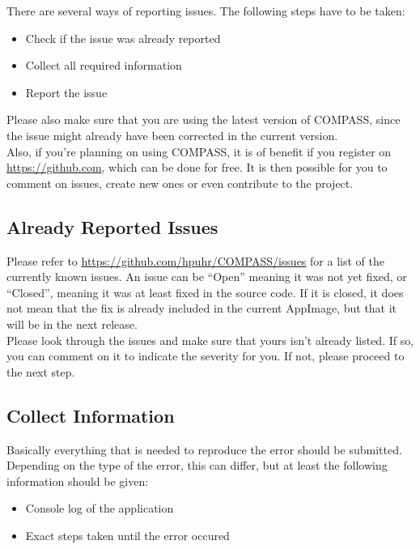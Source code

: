 There are several ways of reporting issues. The following steps have to be taken:

\begin{itemize}  
\item Check if the issue was already reported
\item Collect all required information
\item Report the issue
\end{itemize} 

Please also make sure that you are using the latest version of COMPASS, since the issue might already have been corrected in the current version. \\

Also, if you're planning on using COMPASS, it is of benefit if you register on \url{https://github.com}, which can be done for free. It is then possible for you to comment on issues, create new ones or even contribute to the project.

\subsection{Already Reported Issues}

Please refer to \url{https://github.com/hpuhr/COMPASS/issues} for a list of the currently known issues. An issue can be ``Open'' meaning it was not yet fixed, or ``Closed'', meaning it was at least fixed in the source code. If it is closed, it does not mean that the fix is already included in the current AppImage, but that it will be in the next release. \\

Please look through the issues and make sure that yours isn't already listed. If so, you can comment on it to indicate the severity for you. If not, please proceed to the next step.

\subsection{Collect Information}

Basically everything that is needed to reproduce the error should be submitted. Depending on the type of the error, this can differ, but at least the following information should be given:

\begin{itemize}  
\item Console log of the application
\item Exact steps taken until the error occured
\end{itemize} 

